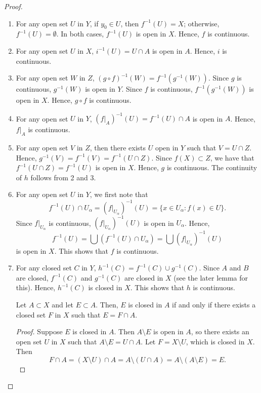 \begin{proof}
  \begin{enumerate}
    \item For any open set $U$ in $Y$, if $y_0\in U$, then $f^{-1}(U)=X$; otherwise, $f^{-1}(U)=\emptyset$. In both cases, $f^{-1}(U)$ is open in $X$. Hence, $f$ is continuous.
    \item For any open set $U$ in $X$, $i^{-1}(U)=U\cap A$ is open in $A$. Hence, $i$ is continuous.
    \item For any open set $W$ in $Z$, $(g\circ f)^{-1}(W)=f^{-1}(g^{-1}(W))$. Since $g$ is continuous, $g^{-1}(W)$ is open in $Y$. Since $f$ is continuous, $f^{-1}(g^{-1}(W))$ is open in $X$. Hence, $g\circ f$ is continuous.
    \item For any open set $U$ in $Y$, $(f|_A)^{-1}(U)=f^{-1}(U)\cap A$ is open in $A$. Hence, $f|_A$ is continuous.
    \item For any open set $V$ in $Z$, then there exists $U$ open in $Y$ such that $V=U\cap Z$. Hence, $g^{-1}(V)=f^{-1}(V)=f^{-1}(U\cap Z)$. Since $f(X)\subset Z$, we have that $f^{-1}(U\cap Z)=f^{-1}(U)$ is open in $X$. Hence, $g$ is continuous. The continuity of $h$ follows from 2 and 3.
    \item For any open set $U$ in $Y$, we first note that 
    \[f^{-1}(U)\cap U_\alpha=(f|_{U_\alpha})^{-1}(U)=\{x\in U_\alpha: f(x)\in U\}.\]
    Since $f|_{U_\alpha}$ is continuous, $(f|_{U_\alpha})^{-1}(U)$ is open in $U_\alpha$. Hence,
    \[f^{-1}(U)=\bigcup (f^{-1}(U)\cap U_\alpha)=\bigcup (f|_{U_\alpha})^{-1}(U)\] is open in $X$. This shows that $f$ is continuous.
    \item For any closed set $C$ in $Y$, $h^{-1}(C)=f^{-1}(C)\cup g^{-1}(C)$. Since $A$ and $B$ are closed, $f^{-1}(C)$ and $g^{-1}(C)$ are closed in $X$ (see the later lemma for this). Hence, $h^{-1}(C)$ is closed in $X$. This shows that $h$ is continuous.
    \begin{lemma}
  Let $A\subset X$ and let $E\subset A$. Then, $E$ is closed in $A$ if and only if there exists a closed set $F$ in $X$ such that $E=F\cap A$.
\end{lemma}
\begin{proof}
  Suppose $E$ is closed in $A$. Then $A \setminus E$ is open in $A$, so there exists an open set $U$ in $X$ such that $A \setminus E = U \cap A$. Let $F = X \setminus U$, which is closed in $X$. Then
  \[
  F \cap A = (X \setminus U) \cap A = A \setminus (U \cap A) = A \setminus (A \setminus E) = E.
  \]


\end{proof}
\end{enumerate}
\end{proof}
